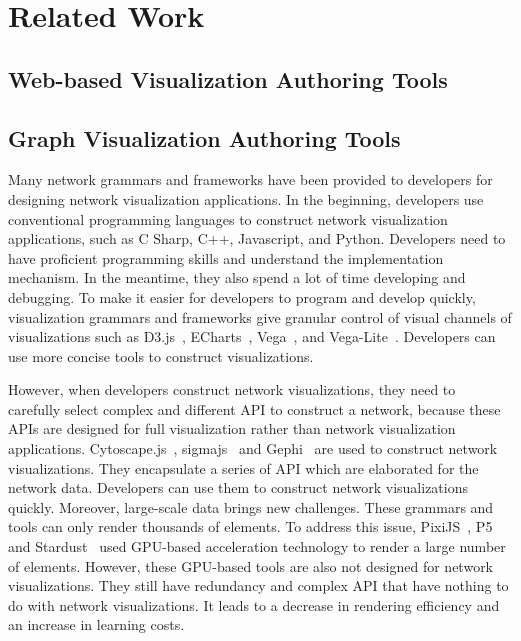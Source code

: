 \section{Related Work}
\subsection{Web-based Visualization Authoring Tools}

\subsection{Graph Visualization Authoring Tools}
Many network grammars and frameworks have been provided to developers for designing network visualization applications.
In the beginning, developers use conventional programming languages to construct network visualization applications, such as C Sharp, C++, Javascript, and Python. Developers need to have proficient programming skills and understand the implementation mechanism.
In the meantime, they also spend a lot of time developing and debugging. To make it easier for developers to program and develop quickly, visualization grammars and frameworks give granular control of visual channels of visualizations such as D3.js~\cite{DBLP:journals/tvcg/BostockOH11}, ECharts~\cite{DBLP:journals/vi/LiMSSZWZC18}, Vega~\cite{DBLP:journals/tvcg/SatyanarayanRHH16}, and Vega-Lite~\cite{DBLP:journals/tvcg/SatyanarayanMWH17}. Developers can use more concise tools to construct visualizations.


However, when developers construct network visualizations, they need to carefully select complex and different API to construct a network, because these APIs are designed for full visualization rather than network visualization applications. Cytoscape.js~\cite{DBLP:journals/bioinformatics/FranzLHDSB16}, sigmajs~\cite{DBLP:journals/jossw/Coene18} and Gephi~\cite{DBLP:conf/icwsm/BastianHJ09} are used to construct network visualizations. They encapsulate a series of API which are elaborated for the network data. Developers can use them to construct network visualizations quickly.
Moreover, large-scale data brings new challenges. These grammars and tools can only render thousands of elements. To address this issue, PixiJS~\cite{graphicslearn}, P5~\cite{DBLP:journals/tvcg/LiM20} and Stardust~\cite{DBLP:journals/cgf/RenLH17} used GPU-based acceleration technology to render a large number of elements.
However, these GPU-based tools are also not designed for network visualizations.
They still have redundancy and complex API that have nothing to do with network visualizations. It leads to a decrease in rendering efficiency and an increase in learning costs.

